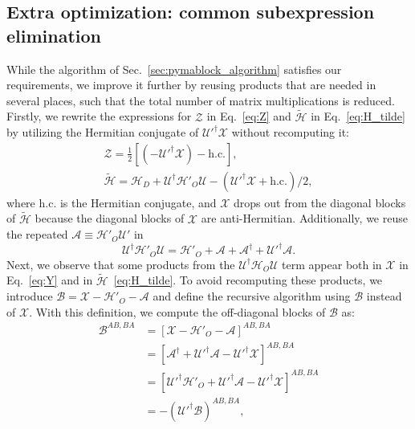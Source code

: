 \subsection{Extra optimization: common subexpression elimination}
While the algorithm of Sec.~\ref{sec:pymablock_algorithm} satisfies our requirements, we improve it further by reusing products that are needed in several places, such that the total number of matrix multiplications is reduced.
Firstly, we rewrite the expressions for $\mathcal{Z}$ in Eq.~\eqref{eq:Z} and $\tilde{\mathcal{H}}$ in Eq.~\eqref{eq:H_tilde} by utilizing the Hermitian conjugate of $\mathcal{U}'^\dagger \mathcal{X}$ without recomputing it:
%
\begin{gather*}
\mathcal{Z} = \frac{1}{2}\left[(-\mathcal{U}'^\dagger \mathcal{X})- \textrm{h.c.}\right],\\
\tilde{\mathcal{H}} = \mathcal{H}_{D} + \mathcal{U}^\dagger \mathcal{H}'_{O} \mathcal{U} - (\mathcal{U}'^\dagger \mathcal{X} + \textrm{h.c.})/2,
\end{gather*}
%
where $\textrm{h.c.}$ is the Hermitian conjugate, and $\mathcal{X}$ drops out from the diagonal blocks of $\tilde{\mathcal{H}}$ because the diagonal blocks of $\mathcal{X}$ are anti-Hermitian.
%
Additionally, we reuse the repeated $\mathcal{A} \equiv \mathcal{H}'_{O}\mathcal{U}'$ in
%
\begin{equation}
\label{eq:UHU}
\mathcal{U}^\dagger \mathcal{H}'_{O} \mathcal{U} = \mathcal{H}'_{O} + \mathcal{A} + \mathcal{A}^\dagger + \mathcal{U}'^\dagger \mathcal{A}.
\end{equation}
%
Next, we observe that some products from the $\mathcal{U}^{\dagger} \mathcal{H}_{O}\mathcal{U}$ term appear both in $\mathcal{X}$ in Eq.~\eqref{eq:Y} and in $\tilde{\mathcal{H}}$~\eqref{eq:H_tilde}.
%
To avoid recomputing these products, we introduce $\mathcal{B} = \mathcal{X} - \mathcal{H}'_{O} - \mathcal{A}$ and define the recursive algorithm using $\mathcal{B}$ instead of $\mathcal{X}$.
%
With this definition, we compute the off-diagonal blocks of $\mathcal{B}$ as:
%
\begin{equation}
\label{eq:B_offdiag}
\begin{aligned}
  \mathcal{B}^{AB, BA} &= \left[\mathcal{X} - \mathcal{H}'_{O} - \mathcal{A} \right]^{AB, BA}\\
  &= \left[\mathcal{A}^\dagger + \mathcal{U}'^\dagger\mathcal{A} - \mathcal{U}'^\dagger \mathcal{X} \right]^{AB, BA}\\
  &= \left[\mathcal{U}'^\dagger\mathcal{H}'_{O} + \mathcal{U}'^\dagger\mathcal{A} - \mathcal{U}'^\dagger \mathcal{X} \right]^{AB, BA}\\
  &= -(\mathcal{U'}^\dagger \mathcal{B})^{AB, BA},
\end{aligned}
\end{equation}
